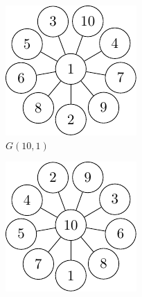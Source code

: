 \begin{figure}
    \centering
    \begin{subfigure}[b]{0.35\textwidth}
        \includegraphics[width=\textwidth]{chapters/gcol/figs/g-10-1.pdf}
        \caption{\label{fig:g-10-1}\(G(10,1)\)}
    \end{subfigure}
    \hfill
    \begin{subfigure}[b]{0.35\textwidth}
        \includegraphics[width=\textwidth]{chapters/gcol/figs/g-10-10.pdf}

\end{subfigure}
\end{figure}
